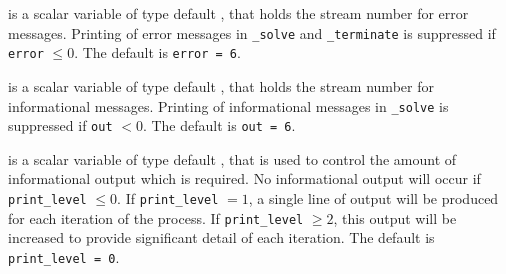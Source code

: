 \begin{description}

 is a scalar variable of type default \integer, that holds the
stream number for error messages. Printing of error messages in 
{\tt \packagename\_solve} and {\tt \packagename\_terminate} 
is suppressed if {\tt error} $\leq 0$.
The default is {\tt error = 6}.

 is a scalar variable of type default \integer, that holds the
stream number for informational messages. Printing of informational messages in 
{\tt \packagename\_solve} is suppressed if {\tt out} $< 0$.
The default is {\tt out = 6}.

 is a scalar variable of type default \integer, that is used
to control the amount of informational output which is required. No 
informational output will occur if {\tt print\_level} $\leq 0$. If 
{\tt print\_level} $= 1$, a single line of output will be produced for each
iteration of the process. If {\tt print\_level} $\geq 2$, this output will be
increased to provide significant detail of each iteration.
The default is {\tt print\_level = 0}.



\end{description}
